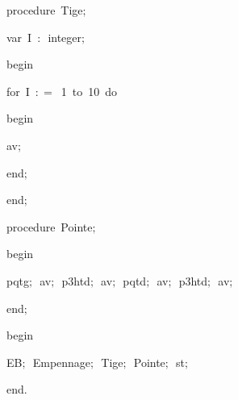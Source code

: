 {\pagebreak[3] 
\vspace{\neglskip}\mbox{\blc  \blk\idt  \mcl procedure\idt \ Tige$;$}\par 
\pagebreak[3] 
\vspace{\neglskip}\mbox{\blc  \blk\blk\idt  \mcl var\idt \ I\ $:$\ integer$;$}\par 
\vspace{\neglskip}\mbox{\blc  \blk\idt  \mcl begin\idt }\par 
\pagebreak[3] 
\vspace{\neglskip}\mbox{\blc  \blk\blk\idt  \mcl for\idt \ I\ $:$$=$\ 1\ \mcl to\idt \ 10\ \mcl do\idt }\par 
\vspace{\neglskip}\mbox{\blc  \blk\blk\blk\idt  \mcl begin\idt }\par 
\vspace{\neglskip}\mbox{\blc  \blk\blk\blk\blk\idt  av$;$}\par 
\vspace{\neglskip}\mbox{\blc  \blk\blk\blk\idt  \mcl end\idt $;$}\par 
\vspace{\neglskip}\mbox{\blc  \blk\idt  \mcl end\idt $;$}\par 
\medskip

\pagebreak[3] 
\vspace{\neglskip}\mbox{\blc  \blk\idt  \mcl procedure\idt \ Pointe$;$}\par 
\vspace{\neglskip}\mbox{\blc  \blk\idt  \mcl begin\idt }\par 
\vspace{\neglskip}\mbox{\blc  \blk\blk\idt  pqtg$;$\ av$;$\ p3htd$;$\ av$;$\ pqtd$;$\ av$;$\ p3htd$;$\ av$;$\ }\par 
\vspace{\neglskip}\mbox{\blc  \blk\idt  \mcl end\idt $;$}\par 
\medskip

\vspace{\neglskip}\mbox{\blc  \idt  \mcl begin\idt }\par 
\vspace{\neglskip}\mbox{\blc  \blk\idt  EB$;$\ Empennage$;$\ Tige$;$\ Pointe$;$\ st$;$\ }\par 
\vspace{\neglskip}\mbox{\blc  \idt  \mcl end\idt $.$}\par 

\medskip }

